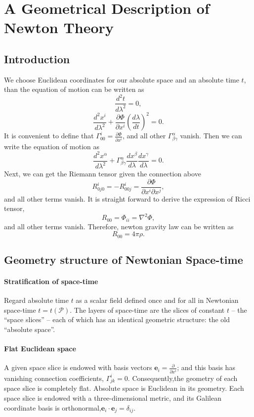 \chapter{A Geometrical Description of Newton Theory}
\section{Introduction}
\noindent
We choose Euclidean coordinates for our absolute space and an absolute time $t$, than the equation of motion can be written as
\[\frac{d^2 t}{d\lambda^2} = 0,\]
\[\frac{d^2 x^i}{d\lambda^2} + \frac{\partial \Phi}{\partial x^i} (\frac{d\lambda}{dt})^2=0.\]
It is convenient to define that $\Gamma^i_{00} = \frac{\partial \Phi}{\partial x^i}$, and all other $\Gamma^{\alpha}_{\beta \gamma}$ vanish. Then we can write the equation of motion as
\[\frac{d^2 x^{\alpha}}{d\lambda^2} + \Gamma^{\alpha}_{\beta \gamma} \frac{dx^{\beta}}{d \lambda} \frac{dx^{\gamma}}{d \lambda}=0.\]
Next, we can get the Riemann tensor given the connection above\[
R^i_{0j0} = -R^i_{00j} = \frac{\partial \Phi}{\partial x^i \partial x^j}, \]
and all other terms vanish. 
It is straight forward to derive the expression of Ricci tensor,
\[R_{00} = \Phi_{ii} = \nabla^2\Phi,\]
and all other terms vanish.
Therefore, newton gravity law can be written as
\[R_{00} = 4\pi\rho.\]

\section{Geometry structure of Newtonian Space-time}
\subsubsection{Stratification of space-time}
Regard absolute time $t$ as a scalar field defined once and for all in Newtonian space-time $t=t(\mathcal{P})$. The layers of space-time are the slices of constant $t$ -- the ``space slices'' -- each of which has an identical geometric structure: the old ``absolute space''.

\subsubsection{Flat Euclidean space}
A given space slice is endowed with basis vectors $\bm{e}_i = \frac{\partial}{\partial x^i}$; and this basis has vanishing connection coefficients, $\Gamma^i_{jk} = 0$. Consequently,the geometry of each space slice is completely flat. Absolute space is Euclidean in its geometry. 
Each space slice is endowed with a three-dimensional metric, and its Galilean coordinate basis is orthonormal,$\bm{e}_i \cdot \bm{e}_j = \delta_{ij}$.

